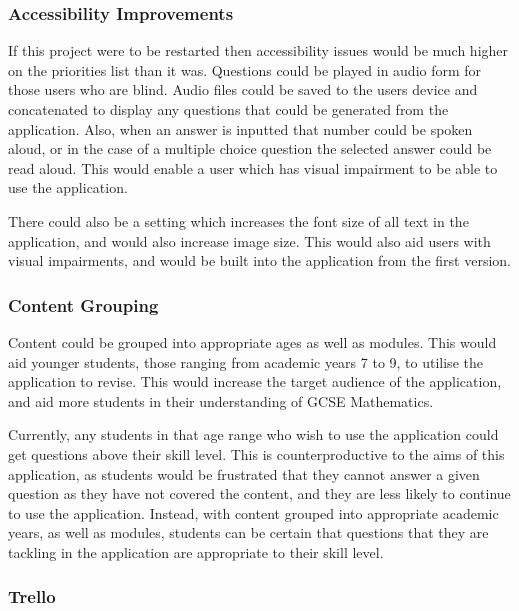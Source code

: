 \documentclass{article}
\begin{document}
\subsubsection{Accessibility Improvements}

If this project were to be restarted then accessibility issues would be much higher on the priorities list than it was. Questions could be played in audio form for those users who are blind. Audio files could be saved to the users device and concatenated to display any questions that could be generated from the application. Also, when an answer is inputted that number could be spoken aloud, or in the case of a multiple choice question the selected answer could be read aloud. This would enable a user which has visual impairment to be able to use the application. \par

There could also be a setting which increases the font size of all text in the application, and would also increase image size. This would also aid users with visual impairments, and would be built into the application from the first version. \par

\subsubsection{Content Grouping}

Content could be grouped into appropriate ages as well as modules. This would aid younger students, those ranging from academic years 7 to 9, to utilise the application to revise. This would increase the target audience of the application, and aid more students in their understanding of GCSE Mathematics. \par

Currently, any students in that age range who wish to use the application could get questions above their skill level. This is counterproductive to the aims of this application, as students would be frustrated that they cannot answer a given question as they have not covered the content, and they are less likely to continue to use the application. Instead, with content grouped into appropriate academic years, as well as modules, students can be certain that questions that they are tackling in the application are appropriate to their skill level. \par

\subsubsection{Trello}
\end{document}
